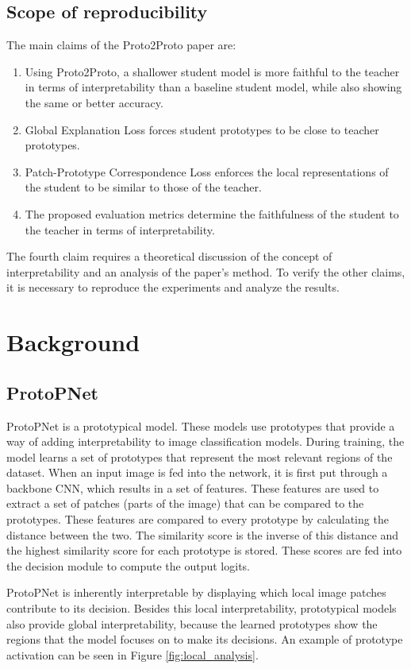 \subsection{Scope of reproducibility}
\label{sec:claims}
The main claims of the Proto2Proto paper are:
\begin{enumerate}    
\item \label{claim1} \hypertarget{claim1}{Using Proto2Proto, a shallower student model is more faithful to the teacher in terms of interpretability than a baseline student model, while also showing the same or better accuracy.}
\item \label{claim2} \hypertarget{claim2}{Global Explanation Loss forces student prototypes to be close to teacher prototypes.}
\item \label{claim3}  \hypertarget{claim3}{Patch-Prototype Correspondence Loss enforces the local representations of the student to be similar to those of the teacher.}
\item \label{claim4}  \hypertarget{claim4}{The proposed evaluation metrics determine the faithfulness of the student to the teacher in terms of interpretability.}
\end{enumerate}

The fourth claim requires a theoretical discussion of the concept of interpretability and an analysis of the paper's method. To verify the other claims, it is necessary to reproduce the experiments and analyze the results.


\section{Background}\label{sec:theory}

\subsection{ProtoPNet}
ProtoPNet is a prototypical model. These models use prototypes that provide a way of adding interpretability to image classification models. During training, the model learns a set of prototypes that represent the most relevant regions of the dataset. When an input image is fed into the network, it is first put through a backbone CNN, which results in a set of features. These features are used to extract a set of patches (parts of the image) that can be compared to the prototypes. These features are compared to every prototype by calculating the distance between the two. The similarity score is the inverse of this distance and the highest similarity score for each prototype is stored. These scores are fed into the decision module to compute the output logits.\par 
ProtoPNet is inherently interpretable by displaying which local image patches contri\-bute to its decision. Besides this local interpretability, prototypical models also provide global interpretability, because the learned prototypes show the regions that the model focuses on to make its decisions. An example of prototype activation can be seen in Figure \ref{fig:local_analysis}. \par

